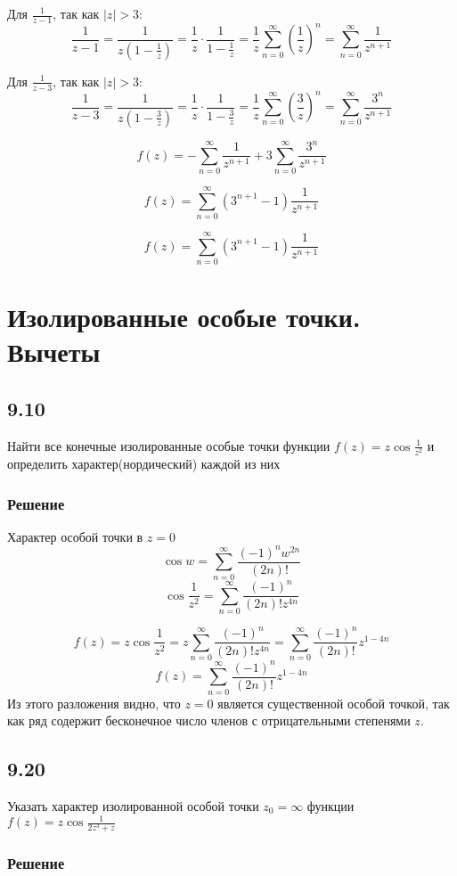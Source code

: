 \documentclass[12pt,a4paper]{article}
\begin{document}
Для \(\frac{1}{z - 1}\), так как \( |z| > 3 \):
\[
\frac{1}{z - 1} = \frac{1}{z\left(1 - \frac{1}{z}\right)} = \frac{1}{z} \cdot \frac{1}{1 - \frac{1}{z}} = \frac{1}{z} \sum_{n=0}^{\infty} \left(\frac{1}{z}\right)^n = \sum_{n=0}^{\infty} \frac{1}{z^{n+1}}
\]

Для \(\frac{1}{z - 3}\), так как \( |z| > 3 \):
\[
\frac{1}{z - 3} = \frac{1}{z\left(1 - \frac{3}{z}\right)} = \frac{1}{z} \cdot \frac{1}{1 - \frac{3}{z}} = \frac{1}{z} \sum_{n=0}^{\infty} \left(\frac{3}{z}\right)^n = \sum_{n=0}^{\infty} \frac{3^n}{z^{n+1}}
\]

\[
f(z) = -\sum_{n=0}^{\infty} \frac{1}{z^{n+1}} + 3 \sum_{n=0}^{\infty} \frac{3^n}{z^{n+1}}
\]

\[
f(z) = \sum_{n=0}^{\infty} \left(3^{n+1} - 1\right) \frac{1}{z^{n+1}}
\]

\[
f(z) = \sum_{n=0}^{\infty} \left(3^{n+1} - 1\right) \frac{1}{z^{n+1}}
\]
\section{Изолированные особые точки. Вычеты}
\subsection*{9.10}
Найти все конечные изолированные особые точки функции $f(z)=z\cos{\frac{1}{z^2}}$ и определить характер(нордический) каждой из них
\subsubsection*{Решение}
Характер особой точки в \( z = 0 \)
\[
\cos w = \sum_{n=0}^{\infty} \frac{(-1)^n w^{2n}}{(2n)!}
\]
\[
\cos \frac{1}{z^2} = \sum_{n=0}^{\infty} \frac{(-1)^n}{(2n)! z^{4n}}
\]

\[
f(z) = z \cos \frac{1}{z^2} = z \sum_{n=0}^{\infty} \frac{(-1)^n}{(2n)! z^{4n}} = \sum_{n=0}^{\infty} \frac{(-1)^n}{(2n)!} z^{1 - 4n}
\]
\[
f(z) = \sum_{n=0}^{\infty} \frac{(-1)^n}{(2n)!} z^{1 - 4n}
\]
Из этого разложения видно, что \( z = 0 \) является существенной особой точкой, так как ряд содержит бесконечное число членов с отрицательными степенями \( z \).

\subsection*{9.20}
Указать характер изолированной особой точки $z_0=\infty$ функции $f(z)=z\cos{\frac{1}{2z^3+z}}$
\subsubsection*{Решение}
\end{document}
